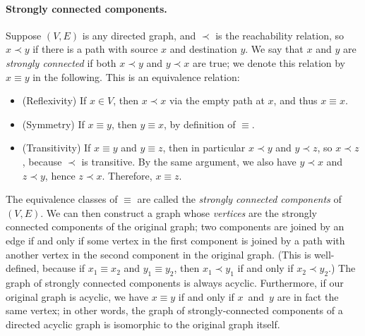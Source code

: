\documentclass[../generics]{subfiles}
\begin{document}
\begin{listing}\label{protocol component listing}
\end{listing}

\paragraph{Strongly connected components.}
Suppose $(V, E)$ is any directed graph, and $\prec$ is the reachability relation, so $x\prec y$ if there is a path with source $x$ and destination $y$. We say that $x$ and $y$ are \emph{strongly connected} if both $x\prec y$ and $y\prec x$ are true; we denote this relation by $x\equiv y$ in the following. This is an equivalence relation:
\begin{itemize}
\item {}(Reflexivity) If $x\in V$, then $x\prec x$ via the empty path at $x$, and thus $x\equiv x$.
\item {}(Symmetry) If $x\equiv y$, then $y\equiv x$, by definition of $\equiv$.
\item {}(Transitivity) If $x\equiv y$ and $y\equiv z$, then in particular $x\prec y$ and $y\prec z$, so $x\prec z$, because $\prec$ is transitive. By the same argument, we also have $y\prec x$ and $z\prec y$, hence $z\prec x$. Therefore, $x\equiv z$.
\end{itemize}

The equivalence classes of $\equiv$ are called the \emph{strongly connected components} of $(V, E)$. We can then construct a graph whose \emph{vertices} are the strongly connected components of the original graph; two components are joined by an edge if and only if some vertex in the first component is joined by a path with another vertex in the second component in the original graph. (This is well-defined, because if $x_1\equiv x_2$ and $y_1\equiv y_2$, then $x_1\prec y_1$ if and only if $x_2\prec y_2$.) The graph of strongly connected components is always acyclic. Furthermore, if our original graph is acyclic, we have $x\equiv y$ if and only if $x$~and~$y$ are in fact the same vertex; in other words, the graph of strongly-connected components of a directed acyclic graph is isomorphic to the original graph itself.
\end{document}
